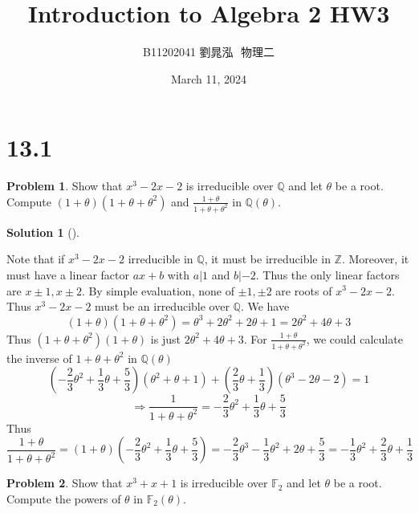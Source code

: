 \documentclass{article}
\title{Introduction to Algebra 2 HW3}
\author{B11202041 劉晁泓 $ $ 物理二}
\date{March 11, 2024}
\theoremstyle{definition}
\newtheorem{prob}{Problem}
\newtheorem*{sol}{Solution}
\newenvironment{sols}[1][]{%
  \begin{sol}[#1]$ $\par\nobreak\ignorespaces
}{%
  \end{sol}
}
\begin{document}
\maketitle
\thispagestyle{fancy}
\renewcommand{\footrulewidth}{0.4pt}
\cfoot{\thepage}
\renewcommand{\headrulewidth}{0.4pt}

\section*{13.1}

\setcounter{prob}{1}
\begin{prob}
	Show that $x^3 - 2x - 2$ is irreducible over $\mathbb{Q}$ and let $\theta$ be a root. 
	Compute $(1 + \theta) (1 + \theta + \theta^2)$ and $\frac{1 + \theta}{1 + \theta + \theta^2}$ in $\mathbb{Q}(\theta)$.
\end{prob}

\begin{sols}
	Note that if $x^3 - 2x - 2$ irreducible in $\mathbb{Q}$, it must be irreducible in $\mathbb{Z}$.
	Moreover, it must have a linear factor $ax + b$ with $a | 1$ and $b | -2$.
	Thus the only linear factors are $x \pm 1, x \pm 2$. 
	By simple evaluation, none of $\pm 1, \pm 2$ are roots of $x^3 - 2x - 2$.
	Thus $x^3 - 2x - 2$ must be an irreducible over $\mathbb{Q}$. 
	We have
	\[
		(1 + \theta)(1 + \theta + \theta^2) = \theta^3 + 2 \theta^2 + 2 \theta + 1 = 2 \theta^2 + 4 \theta + 3
	\]
	Thus $(1 + \theta + \theta^2)(1 + \theta)$ is just $2 \theta^2 + 4 \theta + 3$.
	For $\frac{1 + \theta}{1 + \theta + \theta^2}$, we could calculate the inverse of $1 + \theta + \theta^2$ in $\mathbb{Q}(\theta)$
	\[
		(-\frac{2}{3} \theta^2 + \frac{1}{3} \theta + \frac{5}{3})(\theta^2 + \theta + 1) + (\frac{2}{3} \theta + \frac{1}{3})(\theta^3 - 2 \theta - 2) = 1
	\]
	\[
		\Rightarrow \frac{1}{1 + \theta + \theta^2} = -\frac{2}{3} \theta^2 + \frac{1}{3} \theta + \frac{5}{3}
	\]
	Thus
	\[
		\frac{1 + \theta}{1 + \theta + \theta^2} = (1 + \theta)(- \frac{2}{3} \theta^2 + \frac{1}{3} \theta + \frac{5}{3}) = -\frac{2}{3} \theta^3 - \frac{1}{3} \theta^2 +2 \theta + \frac{5}{3} = -\frac{1}{3} \theta^2 + \frac{2}{3} \theta + \frac{1}{3} 
	\]
\end{sols}

\begin{prob}
	Show that $x^3 + x + 1$ is irreducible over $\mathbb{F}_2$ and let $\theta$ be a root. 
	Compute the powers of $\theta$ in $\mathbb{F}_2(\theta)$.
\end{prob}
\end{document}
